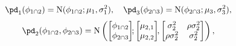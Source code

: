 \begin{equation}
  \begin{gathered}
  \pd_{1}(\phi_{1 \cap 2}) = \text{N}(\phi_{1 \cap 2}; \mu_{1}, \sigma_{1}^{2}), \quad
  \pd_{3}(\phi_{2 \cap 3}) = \text{N}(\phi_{2 \cap 3}; \mu_{3}, \sigma_{3}^{2}), \\[0.3em]
  \pd_{2}(\phi_{1 \cap 2}, \phi_{2 \cap 3}) = \text{N}\left(
    \begin{bmatrix} \phi_{1 \cap 2} \\ \phi_{2 \cap 3} \end{bmatrix}\!\!;
    \begin{bmatrix} \mu_{2, 1} \\ \mu_{2, 2} \end{bmatrix}\!\!,
    \begin{bmatrix} \sigma_{2}^{2} & \rho \sigma_{2}^{2} \\ \rho \sigma_{2}^{2} & \sigma_{2}^{2} \end{bmatrix}
  \right),
  \label{eqn:marginal-gaussian-example}
  \end{gathered}
\end{equation}